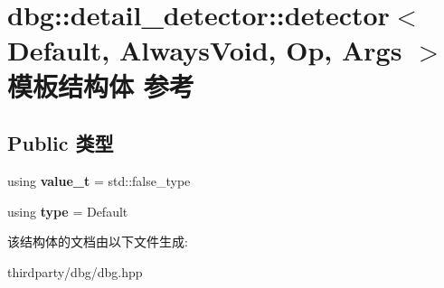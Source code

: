 \hypertarget{structdbg_1_1detail__detector_1_1detector}{}\section{dbg\+:\+:detail\+\_\+detector\+:\+:detector$<$ Default, Always\+Void, Op, Args $>$ 模板结构体 参考}
\label{structdbg_1_1detail__detector_1_1detector}
\subsection*{Public 类型}
\begin{DoxyCompactItemize}
\item 
\mbox{\label{structdbg_1_1detail__detector_1_1detector_af1b6da4282d723669e926c52f446a989}} 
using {\bfseries value\+\_\+t} = std\+::false\+\_\+type
\item 
\mbox{\label{structdbg_1_1detail__detector_1_1detector_aab6b446944545683b9533ea8fc623480}} 
using {\bfseries type} = Default
\end{DoxyCompactItemize}


该结构体的文档由以下文件生成\+:\begin{DoxyCompactItemize}
\item 
thirdparty/dbg/dbg.\+hpp\end{DoxyCompactItemize}
